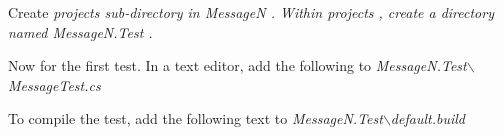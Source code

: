 Create \em projects \em sub-directory in \em MessageN \em. Within \em projects \em, create a directory named \em MessageN.Test \em.

Now for the first test. In a text editor, add the following to \em MessageN.Test$\backslash$MessageTest.cs


To compile the test, add the following text to \em MessageN.Test$\backslash$default.build \em


